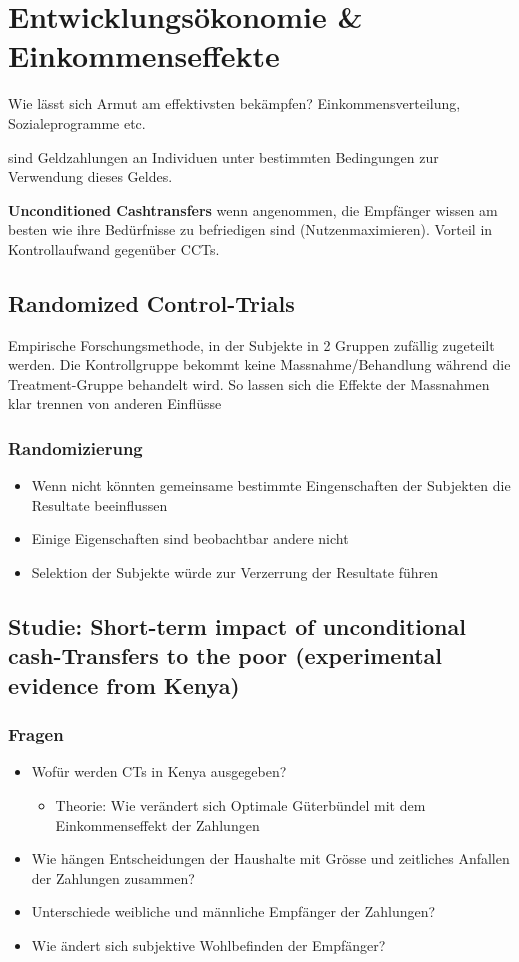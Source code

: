 
\section{Entwicklungsökonomie \& Einkommenseffekte}
Wie lässt sich Armut am effektivsten bekämpfen? Einkommensverteilung, Sozialeprogramme etc.
\begin{definition}
     sind Geldzahlungen an Individuen unter bestimmten Bedingungen zur Verwendung dieses Geldes. 
\end{definition}
\textbf{Unconditioned Cashtransfers} wenn angenommen, die Empfänger wissen am besten wie ihre Bedürfnisse zu befriedigen sind (Nutzenmaximieren). Vorteil in Kontrollaufwand gegenüber CCTs.
\subsection{Randomized Control-Trials}
Empirische Forschungsmethode, in der Subjekte in 2 Gruppen zufällig zugeteilt werden. Die Kontrollgruppe bekommt keine Massnahme/Behandlung während die Treatment-Gruppe behandelt wird. So lassen sich die Effekte der Massnahmen klar trennen von anderen Einflüsse

\subsubsection{Randomizierung}
\begin{itemize}
    \item Wenn nicht könnten gemeinsame bestimmte Eingenschaften der Subjekten die Resultate beeinflussen
    \item Einige Eigenschaften sind beobachtbar andere nicht
    \item Selektion der Subjekte würde zur Verzerrung der Resultate führen
\end{itemize}

\subsection{Studie: Short-term impact of unconditional cash-Transfers to the poor (experimental evidence from Kenya)}
\subsubsection{Fragen}
\begin{itemize}
    \item Wofür werden CTs in Kenya ausgegeben? 
    \begin{itemize}
        \item Theorie: Wie verändert sich Optimale Güterbündel mit dem Einkommenseffekt der Zahlungen
    \end{itemize}
    \item Wie hängen Entscheidungen der Haushalte  mit Grösse und zeitliches Anfallen der Zahlungen zusammen?
    \item Unterschiede weibliche und männliche Empfänger der Zahlungen?
    \item Wie ändert sich subjektive Wohlbefinden der Empfänger?
\end{itemize}

